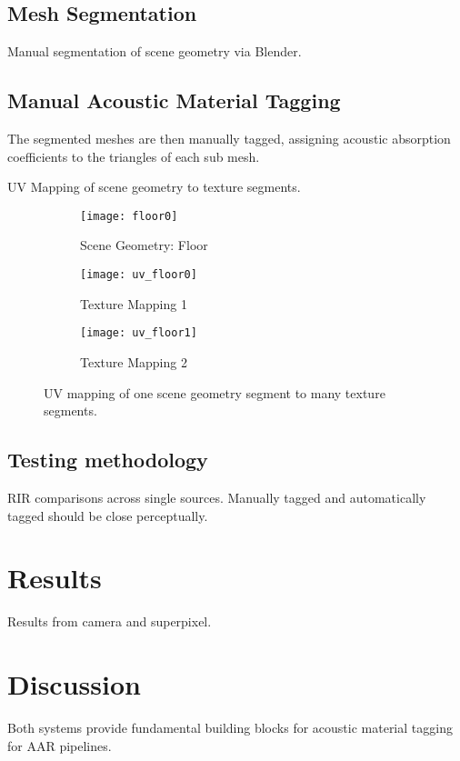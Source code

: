 \subsection{Mesh Segmentation}
Manual segmentation of scene geometry via Blender.

\subsection{Manual Acoustic Material Tagging}
The segmented meshes are then manually tagged, assigning acoustic absorption coefficients to the triangles of each sub mesh.

UV Mapping of scene geometry to texture segments.

\begin{figure}
    \centering
    \begin{subfigure}{0.75\textwidth}
        \texttt{[image: floor0]}
        \caption{Scene Geometry: Floor}
        \label{fig:floor}
    \end{subfigure}
    \hfill
    \begin{subfigure}{0.42\textwidth}
        \texttt{[image: uv\_floor0]}
        \caption{Texture Mapping 1}
        \label{fig:uv_floor}
    \end{subfigure}
    \hfill
    \begin{subfigure}{0.42\textwidth}
        \texttt{[image: uv\_floor1]}
        \caption{Texture Mapping 2}
        \label{fig:uv_floor2}
    \end{subfigure}
            
    \caption{UV mapping of one scene geometry segment to many texture segments.}
    \label{fig:uv_mapping_demo}
\end{figure}


\subsection{Testing methodology}
RIR comparisons across single sources. Manually tagged and automatically tagged should be close perceptually.


\section{Results}
Results from camera and superpixel.



\section{Discussion}
Both systems provide fundamental building blocks for acoustic material tagging for AAR pipelines.

